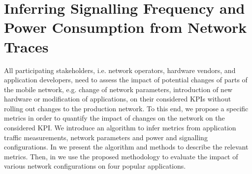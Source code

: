 \section{Inferring Signalling Frequency and Power Consumption from Network Traces}\label{sec:network:network_traces}
All participating stakeholders, i.e. network operators, hardware vendors, and application developers, need to assess the impact of potential changes of parts of the mobile network, e.g. change of network parameters, introduction of new hardware or modification of applications, on their considered \glspl{KPI} without rolling out changes to the production network.
To this end, we propose a specific metrics in order to quantify the impact of changes on the network on the considered \gls{KPI}.
We introduce an algorithm to infer metrics from application traffic measurements, network parameters and power and signalling configurations.
In  we present the algorithm and methods to describe the relevant metrics.
Then, in  we use the proposed methodology to evaluate the impact of various network configurations on four popular applications.
  


